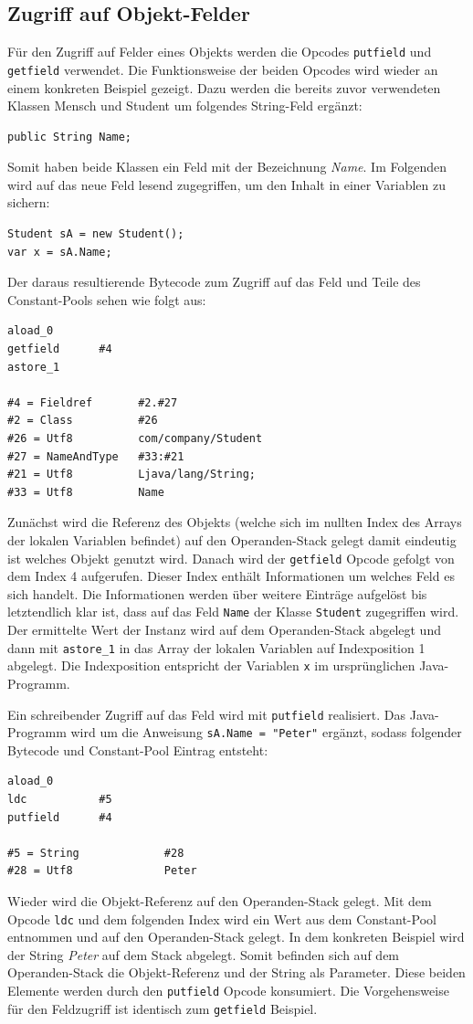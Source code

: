 \documentclass[conference]{IEEEtran}
\begin{document}
\subsection{Zugriff auf Objekt-Felder}
Für den Zugriff auf Felder eines Objekts werden die Opcodes \verb|putfield| und \verb|getfield| verwendet. Die Funktionsweise der beiden Opcodes wird wieder an einem konkreten Beispiel gezeigt. Dazu werden die bereits zuvor verwendeten Klassen Mensch und Student um folgendes String-Feld ergänzt:
\begin{lstlisting}
public String Name;
\end{lstlisting}
Somit haben beide Klassen ein Feld mit der Bezeichnung \textit{Name}. Im Folgenden wird auf das neue Feld lesend zugegriffen, um den Inhalt in einer Variablen zu sichern:
\begin{lstlisting}
Student sA = new Student();
var x = sA.Name;
\end{lstlisting}
Der daraus resultierende Bytecode zum Zugriff auf das Feld und Teile des Constant-Pools sehen wie folgt aus:
\begin{lstlisting}
aload_0
getfield      #4
astore_1

#4 = Fieldref       #2.#27         
#2 = Class          #26   
#26 = Utf8          com/company/Student         
#27 = NameAndType   #33:#21        
#21 = Utf8          Ljava/lang/String;
#33 = Utf8          Name
\end{lstlisting}
Zunächst wird die Referenz des Objekts (welche sich im nullten Index des Arrays der lokalen Variablen befindet) auf den Operanden-Stack gelegt damit eindeutig ist welches Objekt genutzt wird. Danach wird der \verb|getfield| Opcode gefolgt von dem Index 4 aufgerufen. Dieser Index enthält Informationen um welches Feld es sich handelt. Die Informationen werden über weitere Einträge aufgelöst bis letztendlich klar ist, dass auf das Feld \verb|Name| der Klasse \verb|Student| zugegriffen wird. Der ermittelte Wert der Instanz wird auf dem Operanden-Stack abgelegt und dann mit \verb|astore_1| in das Array der lokalen Variablen auf Indexposition 1 abgelegt. Die Indexposition entspricht der Variablen \verb|x| im ursprünglichen Java-Programm.

Ein schreibender Zugriff auf das Feld wird mit \verb|putfield| realisiert. Das Java-Programm wird um die Anweisung \verb|sA.Name = "Peter"| ergänzt, sodass folgender Bytecode und Constant-Pool Eintrag entsteht:
\begin{lstlisting}
aload_0
ldc           #5
putfield      #4

#5 = String             #28
#28 = Utf8              Peter
\end{lstlisting}
Wieder wird die Objekt-Referenz auf den Operanden-Stack gelegt. Mit dem Opcode \verb|ldc| und dem folgenden Index wird ein Wert aus dem Constant-Pool entnommen und auf den Operanden-Stack gelegt. In dem konkreten Beispiel wird der String \textit{Peter} auf dem Stack abgelegt. Somit befinden sich auf dem Operanden-Stack die Objekt-Referenz und der String als Parameter. Diese beiden Elemente werden durch den \verb|putfield| Opcode konsumiert. Die Vorgehensweise für den Feldzugriff ist identisch zum \verb|getfield| Beispiel. 
\end{document}
